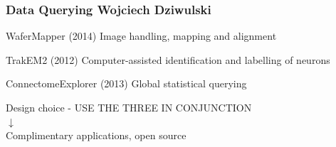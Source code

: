 \documentclass[10pt]{beamer}
\begin{document}
\begin{frame}[fragile]
  \frametitle{Data Querying  \hspace{0pt plus 1 filll} \small{Wojciech Dziwulski}}

  
  
    \begin{block}{WaferMapper (2014) }
		Image handling, mapping and alignment \cite{hayworth2014atum} 
    \end{block}

    \begin{block}{TrakEM2 (2012)}
        Computer-assisted identification and labelling of neurons \cite{cardona2012trakem2} 
    \end{block}
    
    \begin{block}{ConnectomeExplorer (2013)}
        Global statistical querying \cite{beyer2013connectomeexplorer} 
    \end{block}
    
    \begin{center}
             Design choice - \alert{USE THE THREE IN CONJUNCTION}\\
             $\downarrow$ \\
             Complimentary applications, open source
    \end{center}
  
\end{frame}
\end{document}
